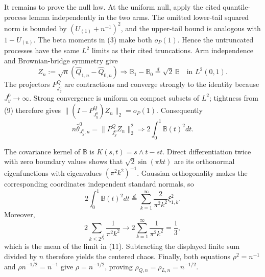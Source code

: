 It remains to prove the null law. At the uniform null, apply the cited quantile-process lemma independently in the two arms. The omitted lower-tail squared norm is bounded by \((U_{(1)}+n^{-1})^2\), and the upper-tail bound is analogous with \(1-U_{(n)}\). The beta moments in (3) make both \(o_P(1)\). Hence the untruncated processes have the same \(L^2\) limits as their cited truncations. Arm independence and Brownian-bridge symmetry give
\[
Z_n:=\sqrt n(\widehat Q_{1,n}-\widehat Q_{0,n})
\Rightarrow\mathbb B_1-\mathbb B_0
\stackrel d=\sqrt2\,\mathbb B
\quad\text{in }L^2(0,1).                              \tag{9}
\]
The projectors \(P^Q_{J_y^0}\) are contractions and converge strongly to the identity because \(J_y^0\to\infty\). Strong convergence is uniform on compact subsets of \(L^2\); tightness from (9) therefore gives \(\|(I-P^Q_{J_y^0})Z_n\|_2=o_P(1)\). Consequently
\[
n\widehat\theta^0_{J_y^0,n}
=\|P^Q_{J_y^0}Z_n\|_2^2
\Rightarrow2\int_0^1\mathbb B(t)^2dt.                \tag{10}
\]

The covariance kernel of \(\mathbb B\) is \(K(s,t)=s\wedge t-st\). Direct differentiation twice with zero boundary values shows that \(\sqrt2\sin(\pi kt)\) are its orthonormal eigenfunctions with eigenvalues \((\pi^2k^2)^{-1}\). Gaussian orthogonality makes the corresponding coordinates independent standard normals, so
\[
2\int_0^1\mathbb B(t)^2dt
\stackrel d=\sum_{k=1}^\infty\frac{2}{\pi^2k^2}\xi_{1,k}^2. \tag{11}
\]
Moreover,
\[
2\sum_{k\le2^{J_y^0}}\frac1{\pi^2k^2}\longrightarrow
2\sum_{k=1}^\infty\frac1{\pi^2k^2}=\frac13,
\]
which is the mean of the limit in (11). Subtracting the displayed finite sum divided by \(n\) therefore yields the centered chaos. Finally, both equations \(\rho^2=n^{-1}\) and \(\rho n^{-1/2}=n^{-1}\) give \(\rho=n^{-1/2}\), proving \(\rho_{Q,n}=\rho_{L,n}=n^{-1/2}\).
